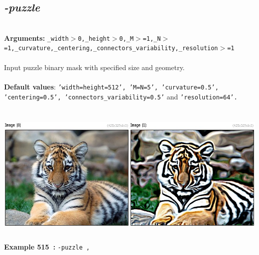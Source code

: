 \documentclass[a4paper,11pt,twoside]{book}
\begin{document}
\subsection{\emph{-puzzle} }\vspace*{-0.5em}
~\\\textbf{Arguments: } 
{\small \texttt{\_width$>$0,\_height$>$0,\_M$>$=1,\_N$>$=1,\_curvature,\_centering,\_connectors\_variability,\_resolution$>$=1}}\\~\\
Input puzzle binary mask with specified size and geometry.
~\\~\\\textbf{Default values}: {\small \texttt{'width=height=512', 'M=N=5', 'curvature=0.5', 'centering=0.5', 'connectors\_variability=0.5'} and \texttt{'resolution=64'.}}
\begin{center}\includegraphics[keepaspectratio=true,height=7cm,width=\textwidth]{img/gmic_def515.jpg}\\
{\footnotesize \textbf{Example 515~:} \texttt{-puzzle ,}}
\end{center}
\end{document}
